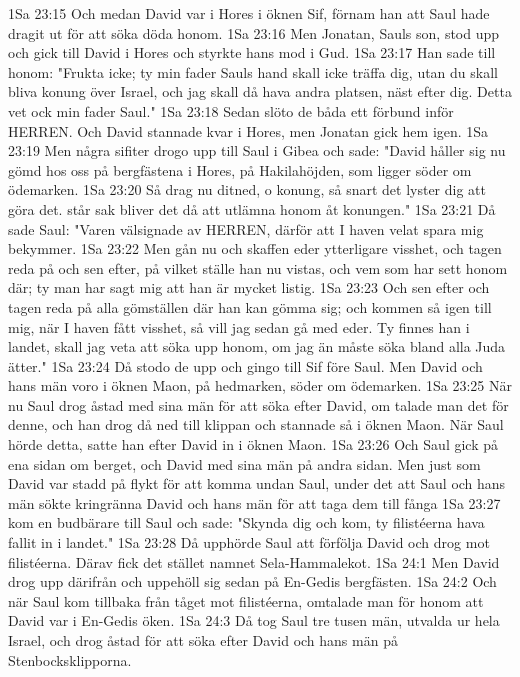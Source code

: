 1Sa 23:15  Och medan David var i Hores i öknen Sif, förnam han att Saul hade dragit ut för att söka döda honom.
1Sa 23:16  Men Jonatan, Sauls son, stod upp och gick till David i Hores och styrkte hans mod i Gud.
1Sa 23:17  Han sade till honom: "Frukta icke; ty min fader Sauls hand skall icke träffa dig, utan du skall bliva konung över Israel, och jag skall då hava andra platsen, näst efter dig. Detta vet ock min fader Saul."
1Sa 23:18  Sedan slöto de båda ett förbund inför HERREN. Och David stannade kvar i Hores, men Jonatan gick hem igen.
1Sa 23:19  Men några sifiter drogo upp till Saul i Gibea och sade: "David håller sig nu gömd hos oss på bergfästena i Hores, på Hakilahöjden, som ligger söder om ödemarken.
1Sa 23:20  Så drag nu ditned, o konung, så snart det lyster dig att göra det. står sak bliver det då att utlämna honom åt konungen."
1Sa 23:21  Då sade Saul: "Varen välsignade av HERREN, därför att I haven velat spara mig bekymmer.
1Sa 23:22  Men gån nu och skaffen eder ytterligare visshet, och tagen reda på och sen efter, på vilket ställe han nu vistas, och vem som har sett honom där; ty man har sagt mig att han är mycket listig.
1Sa 23:23  Och sen efter och tagen reda på alla gömställen där han kan gömma sig; och kommen så igen till mig, när I haven fått visshet, så vill jag sedan gå med eder. Ty finnes han i landet, skall jag veta att söka upp honom, om jag än måste söka bland alla Juda ätter."
1Sa 23:24  Då stodo de upp och gingo till Sif före Saul. Men David och hans män voro i öknen Maon, på hedmarken, söder om ödemarken.
1Sa 23:25  När nu Saul drog åstad med sina män för att söka efter David, om talade man det för denne, och han drog då ned till klippan och stannade så i öknen Maon. När Saul hörde detta, satte han efter David in i öknen Maon.
1Sa 23:26  Och Saul gick på ena sidan om berget, och David med sina män på andra sidan. Men just som David var stadd på flykt för att komma undan Saul, under det att Saul och hans män sökte kringränna David och hans män för att taga dem till fånga
1Sa 23:27  kom en budbärare till Saul och sade: "Skynda dig och kom, ty filistéerna hava fallit in i landet."
1Sa 23:28  Då upphörde Saul att förfölja David och drog mot filistéerna. Därav fick det stället namnet Sela-Hammalekot.
1Sa 24:1  Men David drog upp därifrån och uppehöll sig sedan på En-Gedis bergfästen.
1Sa 24:2  Och när Saul kom tillbaka från tåget mot filistéerna, omtalade man för honom att David var i En-Gedis öken.
1Sa 24:3  Då tog Saul tre tusen män, utvalda ur hela Israel, och drog åstad för att söka efter David och hans män på Stenbocksklipporna.
